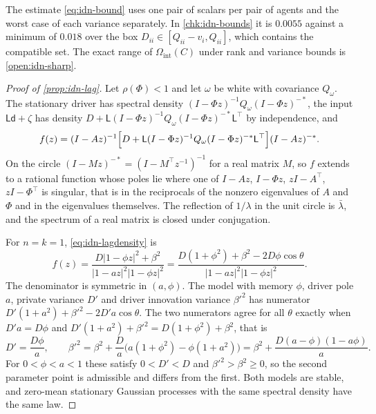 \begin{remark}\label{rem:idn-bound-loose}
The estimate \cref{eq:idn-bound} uses one pair of scalars per pair of agents and the worst case of each variance separately. In \cref{chk:idn-bounds} it is $0.0055$ against a minimum of $0.018$ over the box $D_{ii}\in[Q_{ii}-v_i,Q_{ii}]$, which contains the compatible set. The exact range of $\Omega_{\mathrm{int}}(C)$ under rank and variance bounds is \cref{open:idn-sharp}.
\end{remark}

\begin{proof}[Proof of \cref{prop:idn-lag}]
Let $\rho(\Phi)<1$ and let $\omega$ be white with covariance $Q_\omega$. The stationary driver has spectral density $(I-\Phi z)^{-1}Q_\omega(I-\Phi z)^{-*}$, the input $\mathsf L\mathsf d+\zeta$ has density $D+\mathsf L(I-\Phi z)^{-1}Q_\omega(I-\Phi z)^{-*}\mathsf L^{\top}$ by independence, and
\begin{equation}\label{eq:idn-lagdensity}
f(z)=(I-Az)^{-1}\Bigl[D+\mathsf L(I-\Phi z)^{-1}Q_\omega(I-\Phi z)^{-*}\mathsf L^{\top}\Bigr](I-Az)^{-*}.
\end{equation}
On the circle $(I-Mz)^{-*}=(I-M^{\top}z^{-1})^{-1}$ for a real matrix $M$, so $f$ extends to a rational function whose poles lie where one of $I-Az$, $I-\Phi z$, $zI-A^{\top}$, $zI-\Phi^{\top}$ is singular, that is in the reciprocals of the nonzero eigenvalues of $A$ and $\Phi$ and in the eigenvalues themselves. The reflection of $1/\lambda$ in the unit circle is $\bar\lambda$, and the spectrum of a real matrix is closed under conjugation.

For $n=k=1$, \cref{eq:idn-lagdensity} is
\begin{equation}\label{eq:idn-swap}
f(z)=\frac{D|1-\phi z|^2+\beta^2}{|1-az|^2|1-\phi z|^2}=\frac{D(1+\phi^2)+\beta^2-2D\phi\cos\theta}{|1-az|^2|1-\phi z|^2}.
\end{equation}
The denominator is symmetric in $(a,\phi)$. The model with memory $\phi$, driver pole $a$, private variance $D'$ and driver innovation variance $\beta'^2$ has numerator $D'(1+a^2)+\beta'^2-2D'a\cos\theta$. The two numerators agree for all $\theta$ exactly when $D'a=D\phi$ and $D'(1+a^2)+\beta'^2=D(1+\phi^2)+\beta^2$, that is
\begin{equation}\label{eq:idn-swap-params}
D'=\frac{D\phi}{a},\qquad\beta'^2=\beta^2+\frac Da\bigl(a(1+\phi^2)-\phi(1+a^2)\bigr)=\beta^2+\frac{D(a-\phi)(1-a\phi)}{a}.
\end{equation}
For $0<\phi<a<1$ these satisfy $0<D'<D$ and $\beta'^2>\beta^2\ge0$, so the second parameter point is admissible and differs from the first. Both models are stable, and zero-mean stationary Gaussian processes with the same spectral density have the same law.
\end{proof}

